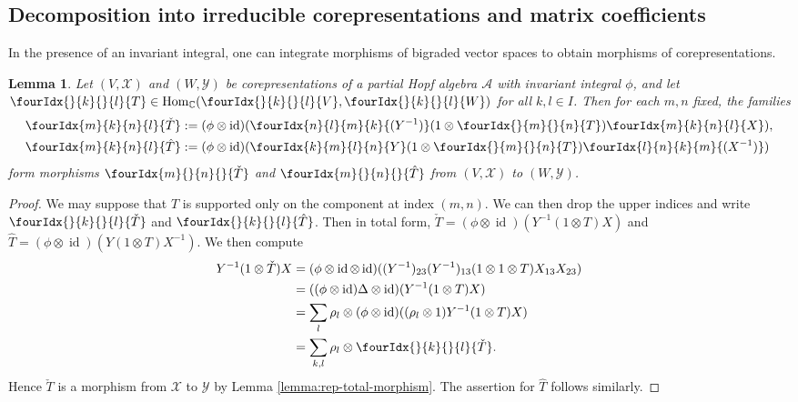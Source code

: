 \documentclass[10pt]{article}
\DeclareMathOperator{\id}{id}
\DeclareMathOperator{\Hom}{Hom}
\newcommand{\C}{\mathbb{C}}
\newcommand{\Gr}[5]{\fourIdx{#2}{#4}{#3}{#5}{#1}}%
\newcommand{\Gru}[3]{\Gr{#1}{}{}{#2}{#3}}
\newcommand{\Grd}[3]{\Gr{#1}{#2}{#3}{}{}}
\newtheorem{Lem}[Theorem]{Lemma}
\theoremstyle{definition}
\numberwithin{equation}{section}
\begin{document}
\subsection{Decomposition into irreducible corepresentations and matrix coefficients}

In the presence of an invariant integral, one can integrate morphisms of bigraded vector spaces to obtain morphisms of corepresentations. 
\begin{Lem} \label{lem:rep-average}  Let $(V,\mathscr{X})$ and
  $(W,\mathscr{Y})$ be corepresentations of  a partial
  Hopf algebra $\mathscr{A}$ with invariant integral $\phi$, and let
  $\Gru{T}{k}{l} \in \Hom_{\C}(\Gru{V}{k}{l},\Gru{W}{k}{l})$ for all $k,l\in I$. Then for each $m,n$ fixed, the families
  \begin{align*}
    \Gr{\check T}{m}{n}{k}{l} &:= (\phi \otimes
    \id)(\Gr{(Y^{-1})}{n}{m}{l}{k}(1\otimes
    \Gru{T}{m}{n})\Gr{X}{m}{n}{k}{l}), \\
    \Gr{\hat T}{m}{n}{k}{l} &:=(\phi \otimes
    \id)(\Gr{Y}{k}{l}{m}{n}(1\otimes
    \Gru{T}{m}{n})\Gr{(X^{-1})}{l}{k}{n}{m})
  \end{align*} 
form  morphisms $\Grd{\check{T}}{m}{n}$ and $\Grd{\hat{T}}{m}{n}$ from $(V,\mathscr{X})$ to $(W,\mathscr{Y})$. 

\end{Lem} 
\begin{proof} We may suppose that $T$ is supported only on the component at index $(m,n)$. We can then drop the upper indices and write $\Gru{\check{T}}{k}{l}$ and $\Gru{\hat{T}}{k}{l}$. Then 
 in total form, $\check{T}=(\phi \otimes \id)(Y^{-1}(1 \otimes T)X)$
  and $\hat{T}=(\phi \otimes \id)(Y(1 \otimes T)X^{-1})$.  We then compute
  \begin{align*}
    Y^{-1}(1 \otimes \check{T})X &= (\phi \otimes \id \otimes
    \id)((Y^{-1})_{23}(Y^{-1})_{13}(1 \otimes 1
    \otimes T)X_{13}X_{23})  \\
    &= ((\phi \otimes\id)  \Delta  \otimes \id)(Y^{-1}(1 \otimes T)X) \\
    &= \sum_{l} \rho_{l} \otimes (\phi \otimes \id)((\rho_{l} \otimes
    1)Y^{-1}(1 \otimes T)X)  \\
    &= \sum_{k,l} \rho_{l} \otimes \Gru{\check T}{k}{l}.
  \end{align*}
  Hence $\check{T}$ is a morphism from $\mathscr{X}$ to $\mathscr{Y}$
  by Lemma \ref{lemma:rep-total-morphism}. The assertion for $\hat
  T$ follows similarly.
\end{proof}
\end{document}
